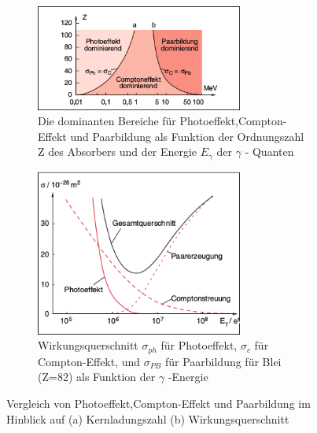 \documentclass[Ex4_Zusammenfassung.tex]{subfiles}
\begin{document}
\begin{figure}[h]
		\begin{subfigure}{\textwidth}
			\centering
			\includegraphics[width=6.8cm]{FCP_Z.png}
			\caption{Die dominanten Bereiche für Photoeffekt,Compton-Effekt und Paarbildung als Funktion der Ordnungszahl Z des Absorbers und der Energie $ E_{\gamma} $ der $ \gamma $ - Quanten}
		\end{subfigure}
		\begin{subfigure}{\textwidth}
			\centering
			\includegraphics[width=6.8cm]{FCP_sigma.png}
			\caption{Wirkungsquerschnitt $ \sigma_{ph} $ für Photoeffekt, $ \sigma_{c} $ für Compton-Effekt, und $ \sigma_{PB} $ für Paarbildung für Blei (Z=82) als Funktion der $ \gamma $ -Energie}
		\end{subfigure}
			\caption{Vergleich von Photoeffekt,Compton-Effekt und Paarbildung im Hinblick auf (a) Kernladungszahl (b) Wirkungsquerschnitt}
\end{figure}
\end{document}

